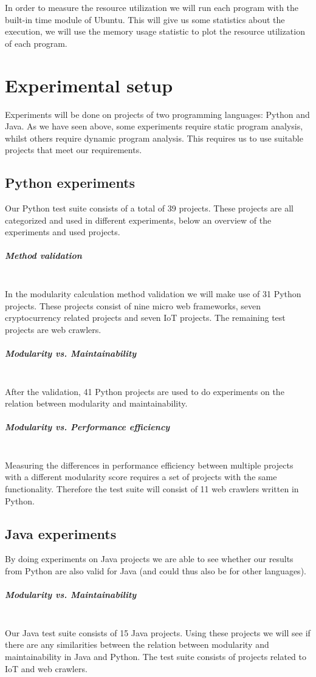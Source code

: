 \documentclass[twoside]{uva-inf-bachelor-thesis}
\newcommand{\myparagraph}[1]{\paragraph{#1}\mbox{}\\}
\begin{document}
In order to measure the resource utilization we will run each program with the built-in time module of Ubuntu. This will give us some statistics about the execution, we will use the memory usage statistic to plot the resource utilization of each program.

\chapter{Experimental setup}
Experiments will be done on projects of two programming languages: Python and Java. As we have seen above, some experiments require static program analysis, whilst others require dynamic program analysis. This requires us to use suitable projects that meet our requirements.

\section{Python experiments}
Our Python test suite consists of a total of 39 projects. These projects are all categorized and used in different experiments, below an overview of the experiments and used projects.

\myparagraph{Method validation}
In the modularity calculation method validation we will make use of 31 Python projects. These projects consist of nine micro web frameworks, seven cryptocurrency related projects and seven IoT projects. The remaining test projects are web crawlers.

\myparagraph{Modularity vs. Maintainability}
After the validation, 41 Python projects are used to do experiments on the relation between modularity and maintainability.

\myparagraph{Modularity vs. Performance efficiency}
Measuring the differences in performance efficiency between multiple projects with a different modularity score requires a set of projects with the same functionality. Therefore the test suite will consist of 11 web crawlers written in Python.

\section{Java experiments}
By doing experiments on Java projects we are able to see whether our results from Python are also valid for Java (and could thus also be for other languages).

\myparagraph{Modularity vs. Maintainability}
Our Java test suite consists of 15 Java projects. Using these projects we will see if there are any similarities between the relation between modularity and maintainability in Java and Python. The test suite consists of projects related to IoT and web crawlers.
\end{document}
